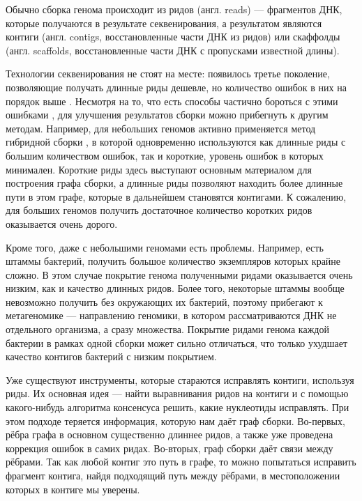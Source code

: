 \documentclass[14pt]{matmex-diploma-custom}
\begin{document}
Обычно сборка генома происходит из ридов (англ. reads) --- фрагментов ДНК, которые получаются в результате секвенирования, а результатом являются контиги (англ. contigs, восстановленные части ДНК из ридов) или скаффолды (англ. scaffolds, восстановленные части ДНК с пропусками известной длины).

Технологии секвенирования не стоят на месте: появилось третье поколение, позволяющие получать длинные риды дешевле, но количество ошибок в них на порядок выше \cite{art:reads}. Несмотря на то, что есть способы частично бороться с этими ошибками \cite{art:alic2016objective}, для улучшения результатов сборки можно прибегнуть к другим методам. Например, для небольших геномов активно применяется метод гибридной сборки \cite{art:hybridSpades, art:zimin2013masurca, art:wick2017unicycler}, в которой одновременно используются как длинные риды с большим количеством ошибок, так и короткие, уровень ошибок в которых минимален. Короткие риды здесь выступают основным материалом для построения графа сборки, а длинные риды позволяют находить более длинные пути в этом графе, которые в дальнейшем становятся контигами. К сожалению, для больших геномов получить достаточное количество коротких ридов оказывается очень дорого.

Кроме того, даже с небольшими геномами есть проблемы. Например, есть штаммы бактерий, получить большое количество экземпляров которых крайне сложно. В этом случае покрытие генома полученными ридами оказывается очень низким, как и качество длинных ридов. Более того, некоторые штаммы вообще невозможно получить без окружающих их бактерий, поэтому прибегают к метагеномике --- направлению геномики, в котором рассматриваются ДНК не отдельного организма, а сразу множества. Покрытие ридами генома каждой бактерии в рамках одной сборки может сильно отличаться, что только ухудшает качество контигов бактерий с низким покрытием.

Уже существуют инструменты, которые стараются исправлять контиги, используя риды. Их основная идея --- найти выравнивания ридов на контиги и с помощью какого-нибудь алгоритма консенсуса решить, какие нуклеотиды исправлять. При этом подходе теряется информация, которую нам даёт граф сборки. Во-первых, рёбра графа в основном существенно длиннее ридов, а также уже проведена коррекция ошибок в самих ридах. Во-вторых, граф сборки даёт связи между рёбрами. Так как любой контиг это путь в графе, то можно попытаться исправить фрагмент контига, найдя подходящий путь между рёбрами, в местоположении которых в контиге мы уверены.
\end{document}
